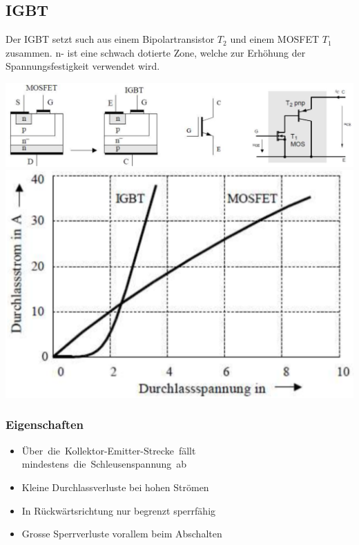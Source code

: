 \subsection{IGBT}
Der IGBT setzt such aus einem Bipolartransistor $ T_2 $ und einem MOSFET $ T_1 $ zusammen.\newline
    n- ist eine schwach dotierte Zone, welche zur Erhöhung der Spannungsfestigkeit verwendet wird.
\begin{center}
  \includegraphics[width=0.7\linewidth]{images/IGBTaufbau}
  \includegraphics[width=0.25\linewidth]{images/IGBTkennlinie}
\end{center}
\vspace{-0.5cm}
\subsubsection{Eigenschaften}
\begin{multicols}{2}
    \begin{itemize}
        \item \mbox{Über die Kollektor-Emitter-Strecke fällt} \newline \mbox{mindestens die Schleusenspannung ab}
        \item Kleine Durchlassverluste bei hohen Strömen
        \item In Rückwärtsrichtung nur begrenzt sperrfähig
        \item Grosse Sperrverluste vorallem beim Abschalten
    \end{itemize}
\end{multicols}
\clearpage


